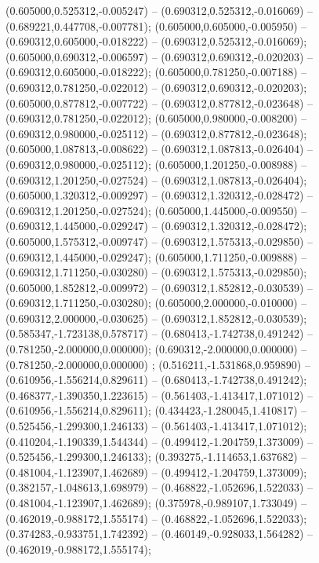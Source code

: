  (0.605000,0.525312,-0.005247) -- (0.690312,0.525312,-0.016069) -- (0.689221,0.447708,-0.007781);
 (0.605000,0.605000,-0.005950) -- (0.690312,0.605000,-0.018222) -- (0.690312,0.525312,-0.016069);
 (0.605000,0.690312,-0.006597) -- (0.690312,0.690312,-0.020203) -- (0.690312,0.605000,-0.018222);
 (0.605000,0.781250,-0.007188) -- (0.690312,0.781250,-0.022012) -- (0.690312,0.690312,-0.020203);
 (0.605000,0.877812,-0.007722) -- (0.690312,0.877812,-0.023648) -- (0.690312,0.781250,-0.022012);
 (0.605000,0.980000,-0.008200) -- (0.690312,0.980000,-0.025112) -- (0.690312,0.877812,-0.023648);
 (0.605000,1.087813,-0.008622) -- (0.690312,1.087813,-0.026404) -- (0.690312,0.980000,-0.025112);
 (0.605000,1.201250,-0.008988) -- (0.690312,1.201250,-0.027524) -- (0.690312,1.087813,-0.026404);
 (0.605000,1.320312,-0.009297) -- (0.690312,1.320312,-0.028472) -- (0.690312,1.201250,-0.027524);
 (0.605000,1.445000,-0.009550) -- (0.690312,1.445000,-0.029247) -- (0.690312,1.320312,-0.028472);
 (0.605000,1.575312,-0.009747) -- (0.690312,1.575313,-0.029850) -- (0.690312,1.445000,-0.029247);
 (0.605000,1.711250,-0.009888) -- (0.690312,1.711250,-0.030280) -- (0.690312,1.575313,-0.029850);
 (0.605000,1.852812,-0.009972) -- (0.690312,1.852812,-0.030539) -- (0.690312,1.711250,-0.030280);
 (0.605000,2.000000,-0.010000) -- (0.690312,2.000000,-0.030625) -- (0.690312,1.852812,-0.030539);
 (0.585347,-1.723138,0.578717) -- (0.680413,-1.742738,0.491242) -- (0.781250,-2.000000,0.000000);
 (0.690312,-2.000000,0.000000) -- (0.781250,-2.000000,0.000000) ;
 (0.516211,-1.531868,0.959890) -- (0.610956,-1.556214,0.829611) -- (0.680413,-1.742738,0.491242);
 (0.468377,-1.390350,1.223615) -- (0.561403,-1.413417,1.071012) -- (0.610956,-1.556214,0.829611);
 (0.434423,-1.280045,1.410817) -- (0.525456,-1.299300,1.246133) -- (0.561403,-1.413417,1.071012);
 (0.410204,-1.190339,1.544344) -- (0.499412,-1.204759,1.373009) -- (0.525456,-1.299300,1.246133);
 (0.393275,-1.114653,1.637682) -- (0.481004,-1.123907,1.462689) -- (0.499412,-1.204759,1.373009);
 (0.382157,-1.048613,1.698979) -- (0.468822,-1.052696,1.522033) -- (0.481004,-1.123907,1.462689);
 (0.375978,-0.989107,1.733049) -- (0.462019,-0.988172,1.555174) -- (0.468822,-1.052696,1.522033);
 (0.374283,-0.933751,1.742392) -- (0.460149,-0.928033,1.564282) -- (0.462019,-0.988172,1.555174);
